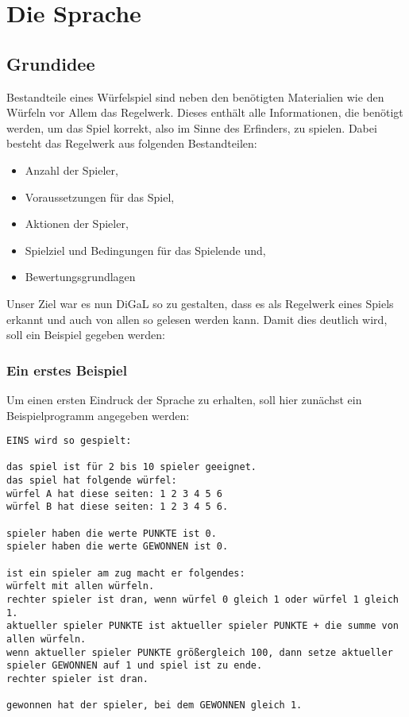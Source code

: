 
\chapter{Die Sprache} %
\label{cha:die_sprache}
	\section{Grundidee}
	\label{sec:grundidee}
		Bestandteile eines Würfelspiel sind neben den benötigten Materialien wie den Würfeln vor Allem das Regelwerk. Dieses enthält alle Informationen, die benötigt werden, um das Spiel korrekt, also im Sinne des Erfinders, zu spielen. Dabei besteht das Regelwerk aus folgenden Bestandteilen:
		\begin{itemize}
			\item Anzahl der Spieler,
			\item Voraussetzungen für das Spiel,
			\item Aktionen der Spieler,
			\item Spielziel und Bedingungen für das Spielende und,
			\item Bewertungsgrundlagen
		\end{itemize}
		Unser Ziel war es nun DiGaL so zu gestalten, dass es als Regelwerk eines Spiels erkannt und auch von allen so gelesen werden kann. Damit dies deutlich wird, soll ein Beispiel gegeben werden:
		\subsection{Ein erstes Beispiel}
		\label{sub:ein_erstes_beispiel}
			Um einen ersten Eindruck der Sprache zu erhalten, soll hier zunächst ein Beispielprogramm angegeben werden:\\
\begin{lstlisting}
EINS wird so gespielt:

das spiel ist für 2 bis 10 spieler geeignet.
das spiel hat folgende würfel:
würfel A hat diese seiten: 1 2 3 4 5 6
würfel B hat diese seiten: 1 2 3 4 5 6.

spieler haben die werte PUNKTE ist 0.
spieler haben die werte GEWONNEN ist 0.

ist ein spieler am zug macht er folgendes:
würfelt mit allen würfeln.
rechter spieler ist dran, wenn würfel 0 gleich 1 oder würfel 1 gleich 1.
aktueller spieler PUNKTE ist aktueller spieler PUNKTE + die summe von allen würfeln.
wenn aktueller spieler PUNKTE größergleich 100, dann setze aktueller spieler GEWONNEN auf 1 und spiel ist zu ende.
rechter spieler ist dran.

gewonnen hat der spieler, bei dem GEWONNEN gleich 1.
\end{lstlisting}

